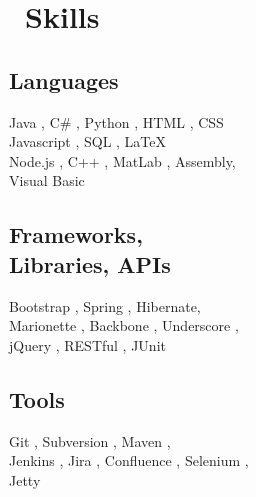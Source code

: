 \documentclass[]{ez-resume-config}
\begin{document}
%
%



%
%

\begin{minipage}[t]{0.33\textwidth} 


\section{\faGear \ Skills}
\subsection{Languages}
\vspace{-1pt}
Java , C\# ,{} Python ,{} HTML ,{}
CSS \\ 
\vspace{3.7pt}
\vspace{-1pt}
Javascript ,{} SQL ,{} \LaTeX\ \\
\vspace{3.7pt}
Node.js ,{} C++ ,{} MatLab ,{} Assembly, 
\\ {} Visual Basic
\sectionsep

\subsection{Frameworks, \\ Libraries, APIs}
Bootstrap ,{} Spring ,{} Hibernate, {} \\ Marionette ,{} Backbone ,{} Underscore ,{} \\ jQuery ,{} RESTful ,{} JUnit
\sectionsep

\subsection{Tools}
Git ,{} Subversion ,{} Maven ,{}  \\  Jenkins ,{} Jira ,{} Confluence ,{} Selenium ,{} \\ Jetty
\sectionsep


\end{minipage}
\end{document}
